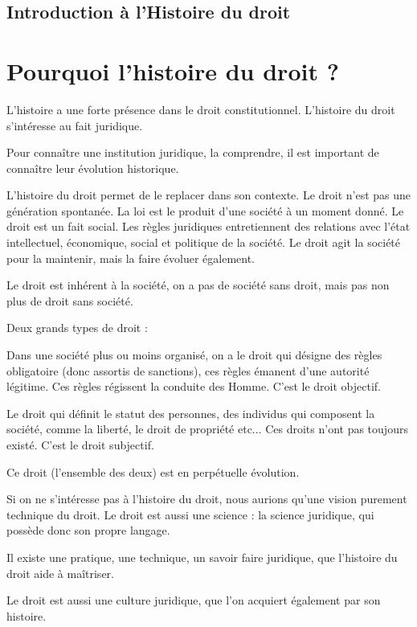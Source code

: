 \chapter{Introduction à l'Histoire du droit}

	\part{Pourquoi l'histoire du droit ?}

L'histoire a une forte présence dans le droit constitutionnel. L'histoire du droit s'intéresse au fait juridique. 

Pour connaître une institution juridique, la comprendre, il est important de connaître leur évolution historique.

L'histoire du droit permet de le replacer dans son contexte. Le droit n'est pas une génération spontanée. La loi est le produit d'une société à un moment donné. Le droit est un fait social. Les règles juridiques entretiennent des relations avec l'état intellectuel, économique, social et politique de la société. Le droit agit la société pour la maintenir, mais la faire évoluer également.

Le droit est inhérent à la société, on a pas de société sans droit, mais pas non plus de droit sans société.

Deux grands types de droit : 

Dans une société plus ou moins organisé, on a le droit qui désigne des règles obligatoire (donc assortis de sanctions), ces règles émanent d'une autorité légitime. Ces règles régissent la conduite des Homme. C'est le droit objectif.

Le droit qui définit le statut des personnes, des individus qui composent la société, comme la liberté, le droit de propriété etc... Ces droits n'ont pas toujours existé. C'est le droit subjectif.

Ce droit (l'ensemble des deux) est en perpétuelle évolution.

Si on ne s'intéresse pas à l'histoire du droit, nous aurions qu'une vision purement technique du droit. Le droit est aussi une science : la science juridique, qui possède donc son propre langage.

Il existe une pratique, une technique, un savoir faire juridique, que l'histoire du droit aide à maîtriser.

Le droit est aussi une culture juridique, que l'on acquiert également par son histoire.
